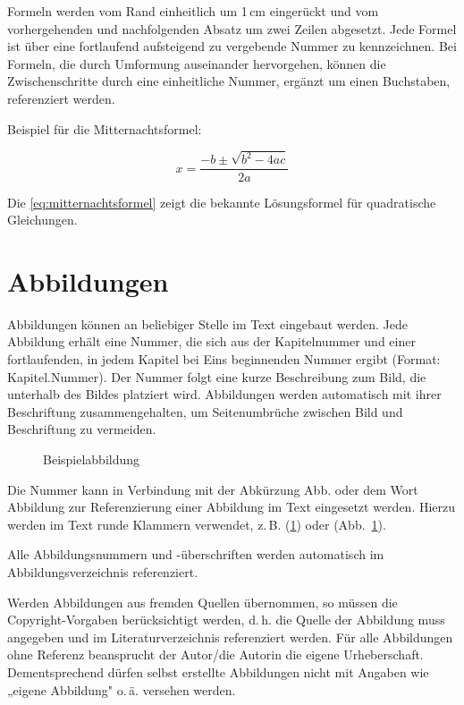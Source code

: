 Formeln werden vom Rand einheitlich um 1\,cm eingerückt und vom vorhergehenden und nachfolgenden Absatz um zwei Zeilen abgesetzt. Jede Formel ist über eine fortlaufend aufsteigend zu vergebende Nummer zu kennzeichnen. Bei Formeln, die durch Umformung auseinander hervorgehen, können die Zwischenschritte durch eine einheitliche Nummer, ergänzt um einen Buchstaben, referenziert werden.

Beispiel für die Mitternachtsformel:

\begin{equation}
	x = \frac{-b \pm \sqrt{b^2 - 4ac}}{2a}
	\label{eq:mitternachtsformel}
\end{equation}

Die \cref{eq:mitternachtsformel} zeigt die bekannte Lösungsformel für quadratische Gleichungen.

\section{Abbildungen}
\label{sec:abbildungen}

Abbildungen können an beliebiger Stelle im Text eingebaut werden. Jede Abbildung erhält eine Nummer, die sich aus der Kapitelnummer und einer fortlaufenden, in jedem Kapitel bei Eins beginnenden Nummer ergibt (Format: Kapitel.Nummer). Der Nummer folgt eine kurze Beschreibung zum Bild, die unterhalb des Bildes platziert wird. Abbildungen werden automatisch mit ihrer Beschriftung zusammengehalten, um Seitenumbrüche zwischen Bild und Beschriftung zu vermeiden.

\begin{figure}[h]
	\centering
	\caption{Beispielabbildung}
	\label{fig:ex01}
\end{figure}

Die Nummer kann in Verbindung mit der Abkürzung Abb. oder dem Wort Abbildung zur Referenzierung einer Abbildung im Text eingesetzt werden. Hierzu werden im Text runde Klammern verwendet, z.\,B. (\cref{fig:ex01}) oder (Abb.~\ref{fig:ex01}).

Alle Abbildungsnummern und -überschriften werden automatisch im Abbildungsverzeichnis referenziert.

Werden Abbildungen aus fremden Quellen übernommen, so müssen die Copyright-Vorgaben berücksichtigt werden, d.\,h. die Quelle der Abbildung muss angegeben und im Literaturverzeichnis referenziert werden. Für alle Abbildungen ohne Referenz beansprucht der Autor/die Autorin die eigene Urheberschaft. Dementsprechend dürfen selbst erstellte Abbildungen nicht mit Angaben wie „eigene Abbildung" o.\,ä. versehen werden.

